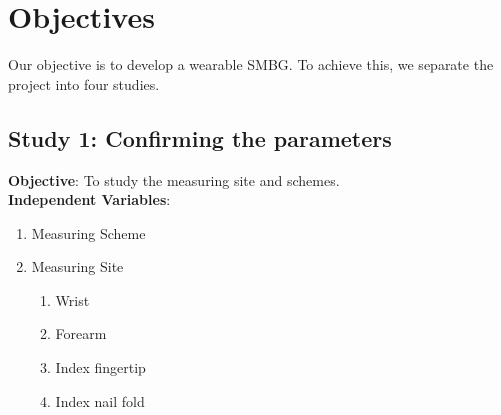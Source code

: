 

\section{Objectives}

Our objective is to develop a wearable SMBG.
To achieve this, we separate the project into four studies.

\subsection{Study 1: Confirming the parameters}

\textbf{Objective}: To study the measuring site and schemes.\\
\textbf{Independent Variables}: 
\begin{enumerate}
    \item Measuring Scheme
    \item Measuring Site
    \begin{enumerate}
        \item Wrist
        \item Forearm
        \item Index fingertip
        \item Index nail fold
    \end{enumerate}
\end{enumerate}

